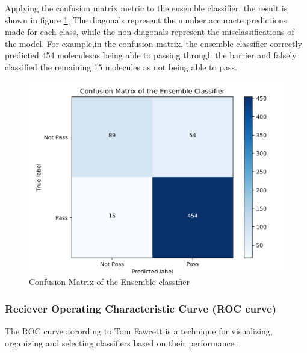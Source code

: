 \documentclass[a4paper,12pt]{report}
\begin{document}
		Applying the confusion matrix metric to the ensemble classifier, the result is shown in figure \ref{fig:confusion_matrix}; The diagonals represent the number accuracte predictions made for each class, while the non-diagonals represent the misclassifications of the model. For example,in the confusion matrix, the ensemble classifier correctly predicted 454 moleculesas being able to passing through the barrier and falsely classified the remaining 15 molecules as not being able to pass.
			\begin{figure}[H]
				\centering
				\includegraphics[width=\textwidth,scale=1]{images/confusion_matrix}
				\caption{Confusion Matrix of the Ensemble classifier}
				\label{fig:confusion_matrix}
			\end{figure}
			
			\subsubsection{Reciever Operating Characteristic Curve (ROC curve)}
			The ROC curve according to Tom Fawcett is a technique for visualizing, organizing and selecting classifiers based on their performance \cite{TFawcett2005}.
			
\end{document}
